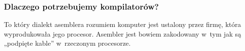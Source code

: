 \documentclass[10pt,t]{beamer}
\begin{document}
\begin{frame}
  \frametitle{Dlaczego potrzebujemy kompilatorów?}






  To który dialekt asemblera rozumiem komputer jest ustalony przez firmę,
  która wyprodukowała jego procesor. Asembler jest bowiem zakodowany w~tym
  jak są „podpięte kable” w~rzeczonym procesorze.



\end{frame}
\end{document}
